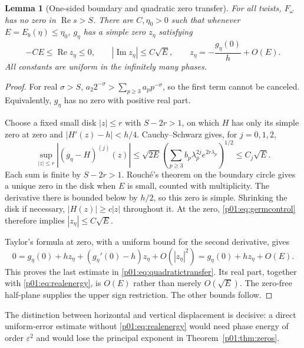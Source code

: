 \documentclass[11pt,letterpaper]{article}
\newtheorem{lemma}[theorem]{Lemma}
\theoremstyle{definition}
\theoremstyle{remark}
\newcommand{\eps}{\varepsilon}
\newcommand{\Ree}{\operatorname{Re}}
\newcommand{\Imm}{\operatorname{Im}}
\newcommand{\1}{\mathbf 1}
\begin{document}
\begin{lemma}[One-sided boundary and quadratic zero transfer]\label{p01:lem:transfer}
For all twists, $F_\omega$ has no zero in $\Ree s>S$.
There are $C,\eta_0>0$ such that whenever $E=E_b(\eta)\le\eta_0$,
$g_\eta$ has a simple zero $z_\eta$ satisfying
\begin{equation}\label{p01:eq:quadratictransfer}
 -CE\le\Ree z_\eta\le0,
 \qquad |\Imm z_\eta|\le C\sqrt E,
 \qquad
 z_\eta=-\frac{g_\eta(0)}h+O(E).
\end{equation}
All constants are uniform in the infinitely many phases.
\end{lemma}
\begin{proof}
For real $\sigma>S$,
$a_2 2^{-\sigma}>\sum_{p\ge3}a_pp^{-\sigma}$, so the first term
cannot be canceled. Equivalently, $g_\eta$ has no zero with positive
real part.

Choose a fixed small disk $|z|\le r$ with $S-2r>1$, on which $H$ has
only its simple zero at zero and $|H'(z)-h|<h/4$.
Cauchy--Schwarz gives, for $j=0,1,2$,
\begin{equation}\label{p01:eq:germcontrol}
 \sup_{|z|\le r}|(g_\eta-H)^{(j)}(z)|
 \le\sqrt{2E}
 \left(\sum_{p\ge3}b_p\lambda_p^{2j}e^{2r\lambda_p}\right)^{1/2}
 \le C_j\sqrt E.
\end{equation}
Each sum is finite by $S-2r>1$.
Rouch\'e's theorem on the boundary circle gives a unique zero in the
disk when $E$ is small, counted with multiplicity. The derivative
there is bounded below by $h/2$, so this zero is simple.
Shrinking the disk if necessary, $|H(z)|\ge c|z|$ throughout it.
At the zero, \eqref{p01:eq:germcontrol} therefore implies
$|z_\eta|\le C\sqrt E$.

Taylor's formula at zero, with a uniform bound for the second
derivative, gives
\[
 0=g_\eta(0)+h z_\eta
   +(g_\eta'(0)-h)z_\eta+O(|z_\eta|^2)
  =g_\eta(0)+h z_\eta+O(E).
\]
This proves the last estimate in \eqref{p01:eq:quadratictransfer}.
Its real part, together with \eqref{p01:eq:realenergy}, is $O(E)$ rather
than merely $O(\sqrt E)$. The zero-free half-plane supplies the upper
sign restriction. The other bounds follow.
\end{proof}

The distinction between horizontal and vertical displacement is
decisive: a direct uniform-error estimate without
\eqref{p01:eq:realenergy} would need phase energy of order $\eps^2$ and
would lose the principal exponent in Theorem~\ref{p01:thm:zeros}.
\end{document}
